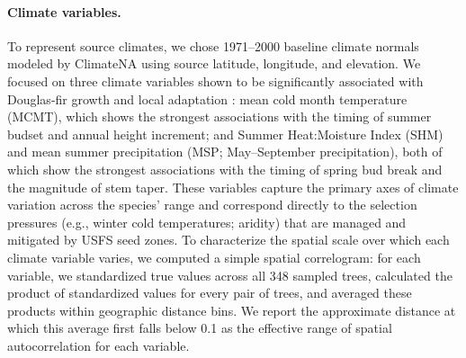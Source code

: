 \documentclass[]{article}
\newcommand{\dfir}{Douglas-fir\xspace}
\providecommand{\revpoint}[2]{}%
\begin{document}
\paragraph{Climate variables.}
To represent source climates,
we chose 1971--2000\revpoint{2}{12} baseline climate normals modeled by
ClimateNA \citep{mahony_global_2022} using source latitude, longitude, and elevation.
We focused on three climate variables shown to be significantly
associated with \dfir growth and local adaptation \citep{stclair_genecology_2005}:
mean cold month temperature (MCMT), which shows the strongest
associations with the timing of summer budset and annual height
increment; and Summer Heat:Moisture Index (SHM) and mean summer
precipitation (MSP; May--September precipitation),
both of which show the strongest associations with
the timing of spring bud break and the magnitude of stem taper.
These variables capture the primary axes of climate variation
across the species' range and correspond directly to the selection
pressures (e.g., winter cold temperatures; aridity) that are
managed and mitigated by USFS seed zones.
To characterize the spatial scale over which each climate variable
varies, we computed a simple spatial correlogram: for each variable,
we standardized true values across all 348 sampled trees, calculated
the product of standardized values for every pair of trees, and
averaged these products within geographic distance bins. We report
the approximate distance at which this average first falls below 0.1
as the effective range of spatial autocorrelation for each variable.
\end{document}
